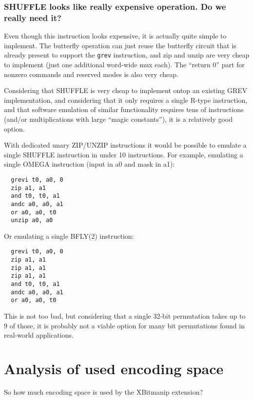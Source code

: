 \subsubsection{SHUFFLE looks like really expensive operation. Do we really need it?}

Even though this instruction looks expensive, it is actually quite simple to
implement.  The butterfly operation can just reuse the butterfly circuit that
is already present to support the {\tt grev} instruction, and zip and unzip are
very cheap to implement (just one additional word-wide mux each). The ``return
0'' part for nonzero commands and reserved modes is also very cheap.

Considering that SHUFFLE is very cheap to implement ontop an existing GREV
implementation, and considering that it only requires a single R-type
instruction, and that software emulation of similar functionality requires tens
of instructions (and/or multiplications with large ``magic constants''), it is a
relatively good option.

With dedicated unary ZIP/UNZIP instructions it would be possible to emulate
a single SHUFFLE instruction in under 10 instructions. For example,
emulating a single OMEGA instruction (input in a0 and mask in a1):

\begin{verbatim}
  grevi t0, a0, 0
  zip a1, a1
  and t0, t0, a1
  andc a0, a0, a1
  or a0, a0, t0
  unzip a0, a0
\end{verbatim}

Or emulating a single BFLY(2) instruction:

\begin{verbatim}
  grevi t0, a0, 0
  zip a1, a1
  zip a1, a1
  zip a1, a1
  and t0, t0, a1
  andc a0, a0, a1
  or a0, a0, t0
\end{verbatim}

This is not too bad, but considering that a single 32-bit permutation takes up to
9 of those, it is probably not a viable option for many bit permutations found
in real-world applications.

\section{Analysis of used encoding space}

So how much encoding space is used by the XBitmanip extension?

